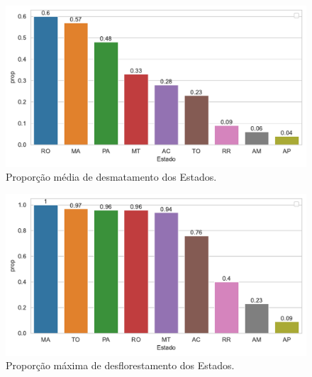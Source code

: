 \documentclass[
]{article}
\begin{document}
\begin{figure}[H]

{\centering \includegraphics{report_files/figure-pdf/fig-states-mean-output-1.pdf}

}

\caption{\label{fig-states-mean}Proporção média de desmatamento dos
Estados.}

\end{figure}

\begin{figure}[H]

{\centering \includegraphics{report_files/figure-pdf/fig-states-max-output-1.pdf}

}

\caption{\label{fig-states-max}Proporção máxima de desflorestamento dos
Estados.}

\end{figure}
\end{document}
